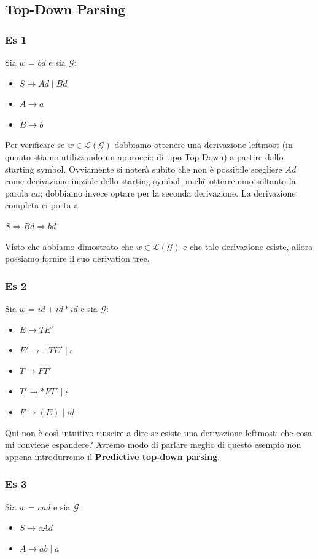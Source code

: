 \documentclass[class=book, crop=false, oneside, 12pt]{standalone}
\begin{document}
\subsection{Top-Down Parsing}
\subsubsection{Es 1}
Sia \(w\) = \(bd\) e sia \(\mathcal{G}\): 
\begin{itemize}
    \item[] \(S \rightarrow Ad \mid Bd\)
    \item[] \(A \rightarrow a\)
    \item[] \(B \rightarrow b\)
\end{itemize}

Per verificare se \(w \in \mathcal{L(G)}\) dobbiamo ottenere una derivazione leftmost (in quanto stiamo utilizzando un approccio di tipo Top-Down) a partire dallo starting symbol. Ovviamente si noterà subito che non è possibile scegliere \(Ad\) come derivazione iniziale dello starting symbol poichè otterremmo soltanto la parola \(aa\); dobbiamo invece optare per la seconda derivazione. La derivazione completa ci porta a

\(S \Rightarrow Bd \Rightarrow bd\)

Visto che abbiamo dimostrato che \(w \in \mathcal{L(G)}\) e che tale derivazione esiste, allora possiamo fornire il suo derivation tree.

\subsubsection{Es 2}
Sia \(w\) = \(id + id * id\) e sia \(\mathcal{G}\):
\begin{itemize}
    \item[] \(E \rightarrow TE'\)
    \item[] \(E' \rightarrow +TE' \mid \epsilon\)
    \item[] \(T \rightarrow FT'\)
    \item[] \(T' \rightarrow *FT' \mid \epsilon\)
    \item[] \(F \rightarrow (E) \mid id\)
\end{itemize}

Qui non è così intuitivo riuscire a dire se esiste una derivazione leftmost: che cosa mi conviene espandere? Avremo modo di parlare meglio di questo esempio non appena introdurremo il \textbf{Predictive top-down parsing}.

\subsubsection{Es 3}
Sia \(w\) = \(cad\) e sia \(\mathcal{G}\):
\begin{itemize}
    \item[] \(S \rightarrow cAd\)
    \item[] \(A \rightarrow ab \mid a\)
\end{itemize}
\end{document}
